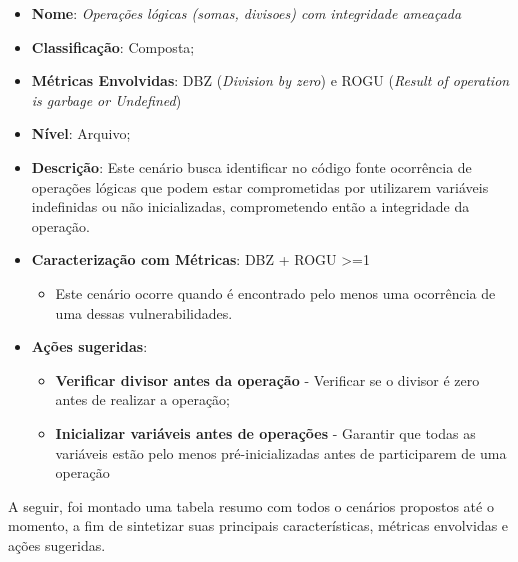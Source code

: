\begin{itemize}
\item \textbf{Nome}: \emph{Operações lógicas (somas, divisoes) com integridade ameaçada}
\item \textbf{Classificação}: Composta;
\item \textbf{Métricas Envolvidas}: DBZ (\emph{Division by zero}) e ROGU (\emph{Result of operation is garbage or Undefined}) 
\item \textbf{Nível}: Arquivo;
\item \textbf{Descrição}: Este cenário busca identificar no código fonte ocorrência de operações lógicas que podem estar comprometidas por utilizarem variáveis indefinidas ou não inicializadas, comprometendo então a integridade da operação.
\item \textbf{Caracterização com Métricas}: DBZ + ROGU >=1
	\begin{itemize}
	\item Este cenário ocorre quando é encontrado pelo menos uma ocorrência de uma dessas vulnerabilidades.
	\end{itemize}
\item \textbf{Ações sugeridas}: 
	\begin{itemize}
	\item \textbf{Verificar divisor antes da operação} - Verificar se o divisor é zero antes de realizar a operação;  
	\item \textbf{Inicializar variáveis antes de operações} - Garantir que todas as variáveis estão pelo menos pré-inicializadas antes de participarem de uma operação 
	 
	\end{itemize}
\end{itemize}


A seguir, foi montado uma tabela resumo com todos o cenários propostos até o momento, a fim de sintetizar suas principais características, métricas envolvidas e ações sugeridas.


